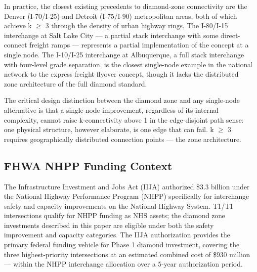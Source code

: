 In practice, the closest existing precedents to diamond-zone connectivity are the Denver (I-70/I-25) and Detroit (I-75/I-90) metropolitan areas, both of which achieve k $\geq$ 3 through the density of urban highway rings. The I-80/I-15 interchange at Salt Lake City --- a partial stack interchange with some direct-connect freight ramps --- represents a partial implementation of the concept at a single node. The I-10/I-25 interchange at Albuquerque, a full stack interchange with four-level grade separation, is the closest single-node example in the national network to the express freight flyover concept, though it lacks the distributed zone architecture of the full diamond standard.

The critical design distinction between the diamond zone and any single-node alternative is that a single-node improvement, regardless of its internal complexity, cannot raise k-connectivity above 1 in the edge-disjoint path sense: one physical structure, however elaborate, is one edge that can fail. k $\geq$ 3 requires geographically distributed connection points --- the zone architecture.

\subsection{FHWA NHPP Funding Context}

The Infrastructure Investment and Jobs Act (IIJA) \citep{IIJA2021} authorized \$3.3 billion under the National Highway Performance Program (NHPP) specifically for interchange safety and capacity improvements on the National Highway System. T1/T1 intersections qualify for NHPP funding as NHS assets; the diamond zone investments described in this paper are eligible under both the safety improvement and capacity categories. The IIJA authorization provides the primary federal funding vehicle for Phase 1 diamond investment, covering the three highest-priority intersections at an estimated combined cost of \$930 million --- within the NHPP interchange allocation over a 5-year authorization period.
